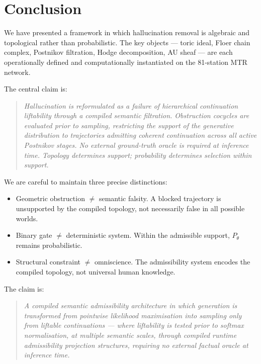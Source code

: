 \documentclass[11pt,a4paper]{article}
\begin{document}
\section{Conclusion}

We have presented a framework in which hallucination removal
is algebraic and topological rather than probabilistic.
The key objects --- toric ideal, Floer chain complex, Postnikov
filtration, Hodge decomposition, AU sheaf --- are each
operationally defined and computationally instantiated on the
81-station MTR network.

The central claim is:

\begin{quote}
\emph{Hallucination is reformulated as a failure of hierarchical
continuation liftability through a compiled semantic filtration.
Obstruction cocycles are evaluated prior to sampling, restricting the
support of the generative distribution to trajectories admitting
coherent continuation across all active Postnikov stages.
No external ground-truth oracle is required at inference time.
Topology determines support; probability determines selection within
support.}
\end{quote}

\noindent
We are careful to maintain three precise distinctions:
\begin{itemize}
  \item Geometric obstruction $\neq$ semantic falsity.
        A blocked trajectory is unsupported by the compiled topology,
        not necessarily false in all possible worlds.
  \item Binary gate $\neq$ deterministic system.
        Within the admissible support, $P_\theta$ remains probabilistic.
  \item Structural constraint $\neq$ omniscience.
        The admissibility system encodes the compiled topology,
        not universal human knowledge.
\end{itemize}
The claim is:

\begin{quote}
\emph{A compiled semantic admissibility architecture in which
generation is transformed from pointwise likelihood maximisation
into sampling only from liftable continuations --- where
liftability is tested prior to softmax normalisation, at multiple
semantic scales, through compiled runtime admissibility projection
structures, requiring no external factual oracle at inference time.}
\end{quote}
\end{document}
